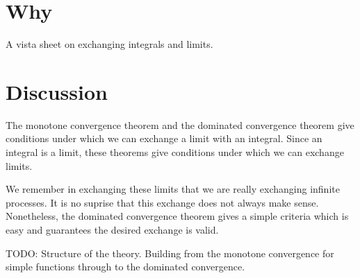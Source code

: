 

\section*{Why}

A vista sheet on exchanging integrals and limits.

\section*{Discussion}

The monotone convergence
theorem and the dominated
convergence theorem give
conditions under which
we can exchange a limit
with an integral.
Since an integral is a limit,
these theorems give conditions
under which we can exchange
limits.

We remember in exchanging
these limits that we are
really exchanging infinite
processes. It is no suprise
that this exchange does not always
make sense.
Nonetheless,
the dominated convergence
theorem gives a simple
criteria which is easy
and guarantees the desired
exchange is valid.

TODO: Structure of the theory.
Building
from the monotone convergence
for simple functions through
to the dominated convergence.

\blankpage